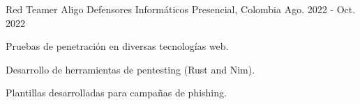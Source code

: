 

\begin{cventries}

  \cventry
    {Red Teamer} %
    {Aligo Defensores Informáticos} %
    {Presencial, Colombia} %
    {Ago. 2022 - Oct. 2022} %
    {
      \begin{cvitems} %
        \item {Pruebas de penetración en diversas tecnologías web.}
        \item {Desarrollo de herramientas de pentesting (Rust and Nim).}
        \item {Plantillas desarrolladas para campañas de phishing.}
      \end{cvitems}
    }


\end{cventries}

